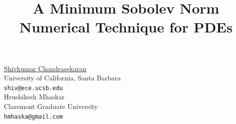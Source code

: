 \documentclass[article, A4, 11pt]{llncs}%
\begin{document}
\title{A Minimum Sobolev Norm Numerical Technique for PDEs}
 \author{} \institute{}
\maketitle
\begin{center}
{\large \underline{Shivkumar Chandrasekaran}}\\
University of California, Santa Barbara\\
{\tt shiv@ece.ucsb.edu}
\\ \vspace{4mm}
{\large Hrushikesh Mhaskar}\\
Claremont Graduate University\\
{\tt hmhaska@gmail.com}
\end{center}
\end{document}
